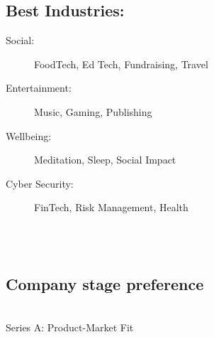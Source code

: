 {{\subsection*{%
Best Industries:
}
\begin{description}
\item[Social:]
FoodTech, Ed Tech, Fundraising, Travel
\item[Entertainment:] Music, Gaming, Publishing
\item[Wellbeing:] Meditation, Sleep, Social Impact %
\item [Cyber Security:] FinTech, Risk Management, Health
\end{description}
\\ \\
\subsection*{Company stage preference}     \\
Series A:
Product-Market Fit






    }%
}
